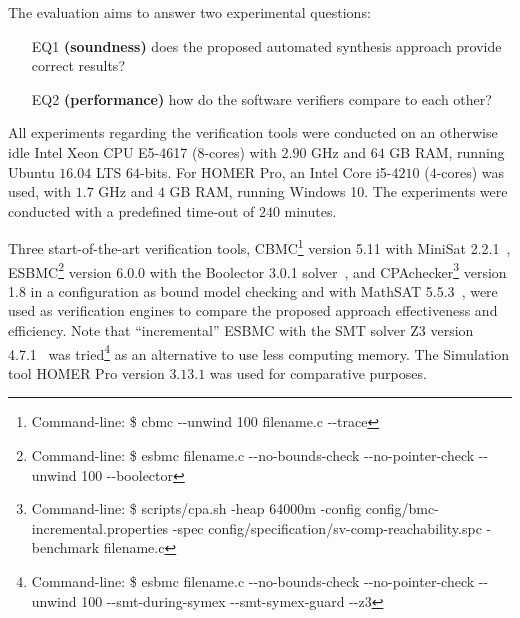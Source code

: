 The evaluation aims to answer two experimental questions: 

\begin{enumerate}

\item[EQ1] \textbf{(soundness)} does the proposed automated synthesis approach provide correct results?

\item[EQ2] \textbf{(performance)} how do the software verifiers compare to each other?

\end{enumerate}

All experiments regarding the verification tools were conducted 
on an otherwise idle Intel Xeon CPU E5-4617 ($8$-cores) with 
$2.90$ GHz and $64$ GB RAM, running Ubuntu $16.04$ LTS $64$-bits. 
For HOMER Pro, an Intel Core i5-$4210$ ($4$-cores) was used, 
with $1.7$ GHz and $4$ GB RAM, running Windows 10. 
The experiments were conducted with a predefined time-out of $240$ minutes.

Three start-of-the-art verification tools, CBMC\footnote{Command-line: \$ cbmc -\phantom{}-unwind 100 filename.c -\phantom{}-trace} version 5.11 with MiniSat 2.2.1~\cite{Kroening}, ESBMC\footnote{Command-line: \$ esbmc filename.c -\phantom{}-no-bounds-check -\phantom{}-no-pointer-check -\phantom{}-unwind 100 -\phantom{}-boolector} version 6.0.0 with the  Boolector 3.0.1 solver~\cite{Brummayer}, %
and CPAchecker\footnote{Command-line: \$ scripts/cpa.sh -heap 64000m -config config/bmc-incremental.properties -spec config/specification/sv-comp-reachability.spc -benchmark filename.c} version 1.8 in a configuration as bound model checking and with MathSAT 5.5.3~\cite{mathsat5}, were used as verification engines to compare the proposed approach effectiveness and efficiency. Note that ``incremental'' ESBMC with the SMT solver Z3 version 4.7.1~\cite{DeMoura} was tried\footnote{Command-line: \$ esbmc filename.c -\phantom{}-no-bounds-check -\phantom{}-no-pointer-check -\phantom{}-unwind 100 -\phantom{}-smt-during-symex -\phantom{}-smt-symex-guard -\phantom{}-z3} as an alternative to use less computing memory. The Simulation tool HOMER Pro version $3.13.1$ was used for comparative purposes.

